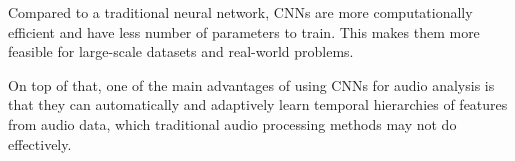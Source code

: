 Compared to a traditional neural network, CNNs are more computationally efficient and have less number of parameters to train. This makes them more feasible for large-scale datasets and real-world problems.

On top of that, one of the main advantages of using CNNs for audio analysis is that they can automatically and adaptively learn temporal hierarchies of features from audio data, which traditional audio processing methods may not do effectively. 







\newpage



